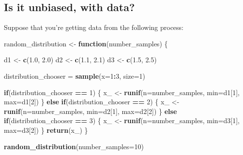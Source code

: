 \documentclass[
]{book}
\newenvironment{Shaded}{\begin{snugshade}}{\end{snugshade}}
\newcommand{\AttributeTok}[1]{\textcolor[rgb]{0.13,0.29,0.53}{#1}}
\newcommand{\ControlFlowTok}[1]{\textcolor[rgb]{0.13,0.29,0.53}{\textbf{#1}}}
\newcommand{\DecValTok}[1]{\textcolor[rgb]{0.00,0.00,0.81}{#1}}
\newcommand{\FloatTok}[1]{\textcolor[rgb]{0.00,0.00,0.81}{#1}}
\newcommand{\FunctionTok}[1]{\textcolor[rgb]{0.13,0.29,0.53}{\textbf{#1}}}
\newcommand{\NormalTok}[1]{#1}
\newcommand{\OtherTok}[1]{\textcolor[rgb]{0.56,0.35,0.01}{#1}}
\newcommand{\SpecialCharTok}[1]{\textcolor[rgb]{0.81,0.36,0.00}{\textbf{#1}}}
\theoremstyle{definition}
\theoremstyle{definition}
\theoremstyle{definition}
\theoremstyle{definition}
\theoremstyle{remark}
\begin{document}
\hypertarget{is-it-unbiased-with-data}{%
\subsection{Is it unbiased, with data?}\label{is-it-unbiased-with-data}}

Suppose that you're getting data from the following process:

\begin{Shaded}
\begin{Highlighting}[]
\NormalTok{random\_distribution }\OtherTok{\textless{}{-}} \ControlFlowTok{function}\NormalTok{(number\_samples) \{ }
  
\NormalTok{  d1 }\OtherTok{\textless{}{-}} \FunctionTok{c}\NormalTok{(}\FloatTok{1.0}\NormalTok{, }\FloatTok{2.0}\NormalTok{)}
\NormalTok{  d2 }\OtherTok{\textless{}{-}} \FunctionTok{c}\NormalTok{(}\FloatTok{1.1}\NormalTok{, }\FloatTok{2.1}\NormalTok{)}
\NormalTok{  d3 }\OtherTok{\textless{}{-}} \FunctionTok{c}\NormalTok{(}\FloatTok{1.5}\NormalTok{, }\FloatTok{2.5}\NormalTok{)}

\NormalTok{  distribution\_chooser }\OtherTok{=} \FunctionTok{sample}\NormalTok{(}\AttributeTok{x=}\DecValTok{1}\SpecialCharTok{:}\DecValTok{3}\NormalTok{, }\AttributeTok{size=}\DecValTok{1}\NormalTok{)}
  
  \ControlFlowTok{if}\NormalTok{(distribution\_chooser }\SpecialCharTok{==} \DecValTok{1}\NormalTok{) \{ }
\NormalTok{    x\_ }\OtherTok{\textless{}{-}} \FunctionTok{runif}\NormalTok{(}\AttributeTok{n=}\NormalTok{number\_samples, }\AttributeTok{min=}\NormalTok{d1[}\DecValTok{1}\NormalTok{], }\AttributeTok{max=}\NormalTok{d1[}\DecValTok{2}\NormalTok{])  }
\NormalTok{  \} }\ControlFlowTok{else} \ControlFlowTok{if}\NormalTok{(distribution\_chooser }\SpecialCharTok{==} \DecValTok{2}\NormalTok{) \{ }
\NormalTok{    x\_ }\OtherTok{\textless{}{-}} \FunctionTok{runif}\NormalTok{(}\AttributeTok{n=}\NormalTok{number\_samples, }\AttributeTok{min=}\NormalTok{d2[}\DecValTok{1}\NormalTok{], }\AttributeTok{max=}\NormalTok{d2[}\DecValTok{2}\NormalTok{]) }
\NormalTok{  \} }\ControlFlowTok{else} \ControlFlowTok{if}\NormalTok{(distribution\_chooser }\SpecialCharTok{==} \DecValTok{3}\NormalTok{) \{ }
\NormalTok{    x\_ }\OtherTok{\textless{}{-}} \FunctionTok{runif}\NormalTok{(}\AttributeTok{n=}\NormalTok{number\_samples, }\AttributeTok{min=}\NormalTok{d3[}\DecValTok{1}\NormalTok{], }\AttributeTok{max=}\NormalTok{d3[}\DecValTok{2}\NormalTok{])}
\NormalTok{  \}}
  \FunctionTok{return}\NormalTok{(x\_)}
\NormalTok{\}}

\FunctionTok{random\_distribution}\NormalTok{(}\AttributeTok{number\_samples=}\DecValTok{10}\NormalTok{)}
\end{Highlighting}
\end{Shaded}
\end{document}
